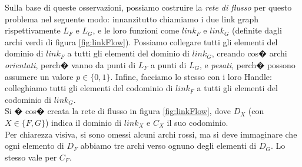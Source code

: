 Sulla base di queste osservazioni, possiamo costruire la \emph{rete di flusso} per questo problema nel seguente modo: innanzitutto chiamiamo i due link graph rispettivamente $L_F$ e $L_G$, e le loro funzioni come $link_F$ e $link_G$ (definite dagli archi verdi di figura \ref{fig:linkFlow}). Possiamo collegare tutti gli elementi del dominio di $link_F$ a tutti gli elementi del dominio di $link_G$, creando cos� archi \emph{orientati}, perch� vanno da punti di $L_F$ a punti di $L_G$, e \emph{pesati}, perch� possono assumere un valore $p \in \{0, 1\}$.
Infine, facciamo lo stesso con i loro Handle: colleghiamo tutti gli elementi del codominio di $link_F$ a tutti gli elementi del codominio di $link_G$. \\
Si � cos� creata la rete di flusso in figura \ref{fig:linkFlow}, dove $D_X$ (con $X \in \{ F, G\}$) indica il dominio di $link_X$ e $C_X$ il suo codominio. \\
Per chiarezza visiva, si sono omessi alcuni archi rossi, ma si deve immaginare che ogni elemento di $D_F$ abbiamo tre archi verso ognuno degli elementi di $D_G$. Lo stesso vale per $C_F$.


